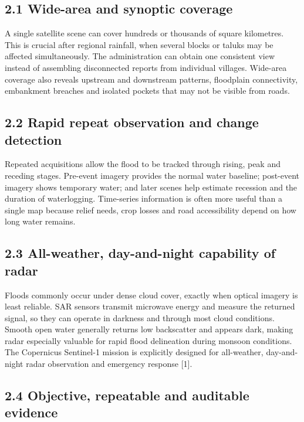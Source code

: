 \documentclass[11pt,a4paper]{article}
\begin{document}
\subsection{2.1 Wide-area and synoptic coverage}\label{wide-area-and-synoptic-coverage}

A single satellite scene can cover hundreds or thousands of square kilometres. This is crucial after regional rainfall, when several blocks or taluks may be affected simultaneously. The administration can obtain one consistent view instead of assembling disconnected reports from individual villages. Wide-area coverage also reveals upstream and downstream patterns, floodplain connectivity, embankment breaches and isolated pockets that may not be visible from roads.

\subsection{2.2 Rapid repeat observation and change detection}\label{rapid-repeat-observation-and-change-detection}

Repeated acquisitions allow the flood to be tracked through rising, peak and receding stages. Pre-event imagery provides the normal water baseline; post-event imagery shows temporary water; and later scenes help estimate recession and the duration of waterlogging. Time-series information is often more useful than a single map because relief needs, crop losses and road accessibility depend on how long water remains.

\subsection{2.3 All-weather, day-and-night capability of radar}\label{all-weather-day-and-night-capability-of-radar}

Floods commonly occur under dense cloud cover, exactly when optical imagery is least reliable. SAR sensors transmit microwave energy and measure the returned signal, so they can operate in darkness and through most cloud conditions. Smooth open water generally returns low backscatter and appears dark, making radar especially valuable for rapid flood delineation during monsoon conditions. The Copernicus Sentinel-1 mission is explicitly designed for all-weather, day-and-night radar observation and emergency response {[}1{]}.

\subsection{2.4 Objective, repeatable and auditable evidence}\label{objective-repeatable-and-auditable-evidence}
\end{document}
